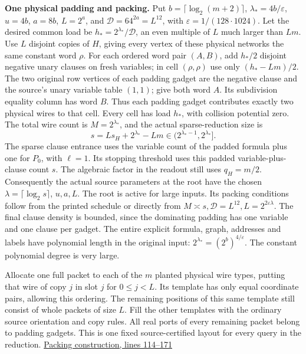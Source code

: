 \documentclass[
  11pt,
]{article}
\begin{document}
\textbf{One physical padding and packing.} Put
\(b=\lceil\log_2(m+2)\rceil\), \(\lambda_* =4b/\varepsilon\), \(u=4b\),
\(a=8b\), \(L=2^a\), and \(\mathcal D=64^{2a}=L^{12}\), with
\(\varepsilon=1/(128\cdot1024)\). Let the desired common load be
\(h_*=2^{\lambda_*}/\mathcal D\), an even multiple of \(L\) much larger
than \(Lm\). Use \(L\) disjoint copies of \(H\), giving every vertex of
these physical networks the same constant word \(\rho\). For each
ordered word pair \((A,B)\), add \(h_*/2\) disjoint negative unary
clauses on fresh variables; in cell \((\rho,\rho)\) use only
\((h_*-Lm)/2\). The two original row vertices of each padding gadget are
the negative clause and the source's unary variable table \((1,1)\);
give both word \(A\). Its subdivision equality column has word \(B\).
Thus each padding gadget contributes exactly two physical wires to that
cell. Every cell has load \(h_*\), with collision potential zero. The
total wire count is \(M=2^{\lambda_*}\), and the actual sparse-reduction
size is \[
 s=L s_H+2^{\lambda_*}-Lm \in (2^{\lambda_*-1},2^{\lambda_*}].
\] The sparse clause entrance uses the variable count of the padded
formula plus one for \(P_0\), with \(\ell=1\). Its stopping threshold
uses this padded variable-plus-clause count \(s\). The algebraic
factor in the readout still uses \(q_H=m/2\). Consequently the actual
source parameters at the root have the chosen
\(\lambda=\lceil\log_2s\rceil\), \(u,a,L\). The root is active for large
inputs. Its packing conditions follow from the printed schedule or
directly from
\(M\asymp s,\mathcal D=L^{12}, L=2^{2\varepsilon\lambda}\). The final
clause density is bounded, since the dominating padding has one variable
and one clause per gadget. The entire explicit formula, graph, addresses
and labels have polynomial length in the original input:
\(2^{\lambda_*}=(2^b)^{4/\varepsilon}\). The constant polynomial degree
is very large.

Allocate one full packet to each of the \(m\) planted physical wire
types, putting that wire of copy \(j\) in slot \(j\) for \(0\le j<L\).
Its template has only equal coordinate pairs, allowing this ordering.
The remaining positions of this same template still consist of whole
packets of size \(L\). Fill the other templates with the ordinary source
orientation and copy rules. All real ports of every remaining packet
belong to padding gadgets. This is one fixed source-certified layout for
every query in the reduction.
\href{https://github.com/openai/math/blob/main/preprints/The-Exponential-Time-Hypothesis-is-False-October-25-2026/build/quantitative-contraction.tex\#L114}{Packing
construction, lines 114--171}
\end{document}
